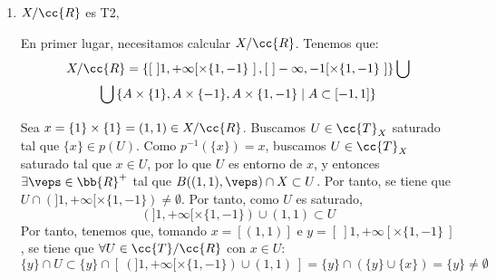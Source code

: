 \documentclass[12pt]{article}
\newcommand{\T}[0]{\cc{T}}
\begin{document}
\begin{ejercicio}[2.5 puntos]
\begin{enumerate}
\begin{comment}
              Como $p^{-1}(p(U)) \neq U$, entonces $U$ no es saturado,
              por lo que $p(U)\notin \T/\cc{R}$ y por tanto $p$ no es abierta.
            \end{comment}

            \item $X/\cc{R}$ es T2,
            
            En primer lugar, necesitamos calcular $X/\cc{R}$. Tenemos que:
            \begin{multline*}
                X/\cc{R} =\left\{
                  \left[~]1, +\infty[ \times \{1,-1\}~\right],
                  \left[~]-\infty, -1[ \times \{1,-1\}~\right]
                \right\}
                \bigcup \\ \bigcup
                \left\{
                  A \times \{1\}, A \times \{-1\}, A \times \{1,-1\}
                  \mid
                  A\subset [-1,1]
                \right\}
            \end{multline*}
            
            \begin{comment}
            Además, tenemos que:
            \begin{multline*}
                \T/\cc{R} = \left\{
                  \left[~]1, +\infty[ \times \{1,-1\}~\right],
                  \left[~]-\infty, -1[ \times \{1,-1\}~\right]
                \right\}
                \bigcup \\ \bigcup
                \left\{
                  A \times \{1\}, A \times \{-1\}, A \times \{1,-1\}
                  \mid
                  A\in \T_{]-1,1[}
                \right\}
            \end{multline*}
            \end{comment}


            Sea $x=\{1\}\times \{1\}=(1,1) \in X/\cc{R}$. Buscamos $U\in \T_X$ saturado
            tal que $\{x\}\in p(U)$. Como $p^{-1}(\{x\}) = x$, buscamos $U\in \T_X$ saturado tal que $x\in U$,
            por lo que $U$ es entorno de $x$, y entonces $\exists \veps\in \bb{R}^+$ tal que
            $B((1,1),\veps)\cap X \subset U$. Por tanto, se tiene que $U\cap \left(]1, +\infty[ \times \{1,-1\}\right) \neq \emptyset$.
            Por tanto, como $U$ es saturado,
            \begin{equation*}
              \left(]1, +\infty[ \times \{1,-1\}\right) \cup \left(1,1\right) \subset U
            \end{equation*}
            Por tanto, tenemos que, tomando $x=\left[(1,1)\right]$ e $y=[~]1, +\infty[ \times \{1,-1\}~]$, se tiene que
            $\forall U\in \T/\cc{R}$ con $x\in U$:
            $$\{y\} \cap U \subset \{y\} \cap \left[~\left(]1, +\infty[ \times \{1,-1\}\right) \cup \left(1,1\right)~\right]
            = \{y\} \cap \left(\{y\}\cup \{x\} \right) = \{y\} \neq \emptyset$$


\end{enumerate}
\end{ejercicio}
\end{document}
